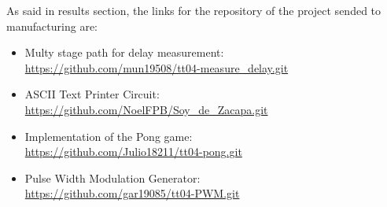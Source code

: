 As said in results section, the links for the repository of the project sended to manufacturing are:
\begin{itemize}
    \item Multy stage path for delay measurement:\\
     \url{https://github.com/mun19508/tt04-measure_delay.git}
    \item ASCII Text Printer Circuit:\\
     \url{https://github.com/NoelFPB/Soy_de_Zacapa.git}
    \item Implementation of the Pong game:\\
     \url{https://github.com/Julio18211/tt04-pong.git}
    \item Pulse Width Modulation Generator:\\
     \url{https://github.com/gar19085/tt04-PWM.git}
\end{itemize}